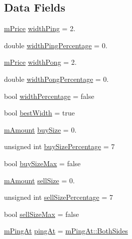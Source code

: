 \subsection*{Data Fields}
\begin{DoxyCompactItemize}
\item 
\hyperlink{km_8h_a392f9b7f384aa3539bbb890b059f5b8c}{m\+Price} \hyperlink{struct_k_1_1m_quoting_params_a4279c166f3d233d69f15f23174b015f5}{width\+Ping} = 2.
\item 
double \hyperlink{struct_k_1_1m_quoting_params_ae713d32ed4985ea64a75a3b67ed2e4d9}{width\+Ping\+Percentage} = 0.
\item 
\hyperlink{km_8h_a392f9b7f384aa3539bbb890b059f5b8c}{m\+Price} \hyperlink{struct_k_1_1m_quoting_params_a259c285d2a55a58a4c5e87f58e18765d}{width\+Pong} = 2.
\item 
double \hyperlink{struct_k_1_1m_quoting_params_acff9ae46960bbd2d759586223fa57081}{width\+Pong\+Percentage} = 0.
\item 
bool \hyperlink{struct_k_1_1m_quoting_params_a3e872a1d8d93fd696268d8abacb97736}{width\+Percentage} = false
\item 
bool \hyperlink{struct_k_1_1m_quoting_params_a7e744b13bec19c083103e7ae84845427}{best\+Width} = true
\item 
\hyperlink{km_8h_ad4d00888c55a47a8a40ed8020d176086}{m\+Amount} \hyperlink{struct_k_1_1m_quoting_params_a78713a07cb23439e664a091f740fef1f}{buy\+Size} = 0.
\item 
unsigned int \hyperlink{struct_k_1_1m_quoting_params_aefdf7026d73172dbed3231b219385e4b}{buy\+Size\+Percentage} = 7
\item 
bool \hyperlink{struct_k_1_1m_quoting_params_a9430749d47750fa7a3571e69aa421524}{buy\+Size\+Max} = false
\item 
\hyperlink{km_8h_ad4d00888c55a47a8a40ed8020d176086}{m\+Amount} \hyperlink{struct_k_1_1m_quoting_params_a4f82c0df812be2c3dc86ab0778b171d7}{sell\+Size} = 0.
\item 
unsigned int \hyperlink{struct_k_1_1m_quoting_params_af5250a47f1886c3ec8366e6c0743434d}{sell\+Size\+Percentage} = 7
\item 
bool \hyperlink{struct_k_1_1m_quoting_params_a91e84c2561413850c96212769eff466c}{sell\+Size\+Max} = false
\item 
\hyperlink{namespace_k_a9d7dedf4873c0cda3ab0c919395b667c}{m\+Ping\+At} \hyperlink{struct_k_1_1m_quoting_params_afb778f21e472d73bf86c2cf855cd4720}{ping\+At} = \hyperlink{namespace_k_a9d7dedf4873c0cda3ab0c919395b667cad20455e0ed8edbd95fbbb7dff3d61503}{m\+Ping\+At\+::\+Both\+Sides}

\end{DoxyCompactItemize}
